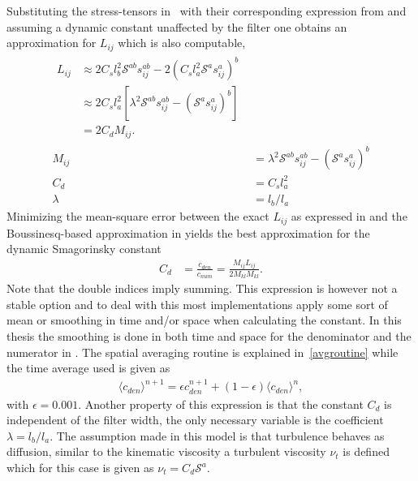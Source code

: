 Substituting the stress-tensors in~ with their corresponding expression 
from  and assuming a dynamic constant unaffected by the filter 
one obtains an approximation for $L_{ij}$ which is also computable,
\begin{align}
    \begin{split}
L_{ij} &\approx 2C_s l_b^2 \mathcal{S}^{ab} s^{ab}_{ij}
        -2 (C_s l_a^2 \mathcal{S}^a s^a_{ij})^b\\
        &\approx 2C_sl_a^2[\lambda^2\mathcal{S}^{ab}s^{ab}_{ij} 
        - (\mathcal{S}^{a}s^{a}_{ij})^b]\\
        &= 2C_d M_{ij}.
        \label{eq:lillystress}
    \end{split} \\
    M_{ij} &= \lambda^{2}\mathcal{S}^{ab}s_{ij}^{ab} - (\mathcal{S}^as_{ij}^a)^b\\
        C_d &= C_sl_a^2\\
        \lambda &= l_b/l_a
    \label{eq:dynsmagderivation}
\end{align}
Minimizing the mean-square error between the exact $L_{ij}$ as expressed in 
and the Boussinesq-based approximation 
in  yields the best approximation 
for the dynamic Smagorinsky constant 
%
\begin{align}
    C_d &= \frac{c_{den}}{c_{num}} = \frac{M_{ij}L_{ij}}{2M_{kl}M_{kl}}.
    \label{eq:dynsmag}
\end{align}
%
Note that the double indices imply summing. This expression is however not a 
stable option and to deal with this most implementations apply some sort of mean or smoothing 
in time and/or space when calculating the constant. In this thesis the smoothing is done in 
both time and space for the denominator and the numerator in .
The spatial averaging routine is explained in~\cref{avgroutine} while the time average used is given 
as 
\begin{align}
\langle c_{den}\rangle^{n+1} = \epsilon c_{den}^{n+1} +(1-\epsilon) \langle c_{den}\rangle^{n},
    \label{eq:time=average}
\end{align}
with $\epsilon = 0.001$.
Another property of this expression is that the constant $C_d$ is 
independent of the filter width, the only necessary variable is the coefficient $\lambda = l_b/l_a$.
The assumption made in this model is that turbulence behaves 
as diffusion, similar to the kinematic viscosity a turbulent viscosity $\nu_t$ is defined which for this case is given as 
$\nu_t = C_d\mathcal{S}^a$.

